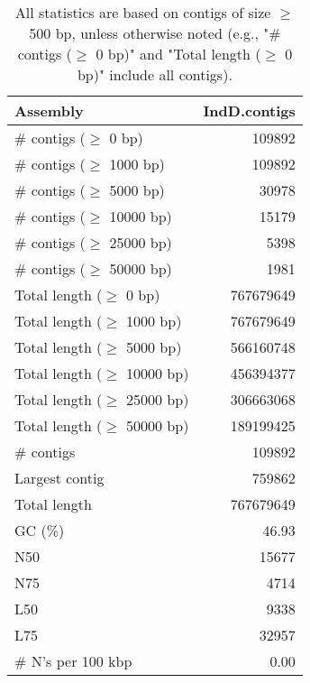 \documentclass[12pt,a4paper]{article}
\begin{document}
\begin{table}[ht]
\begin{center}
\caption{All statistics are based on contigs of size $\geq$ 500 bp, unless otherwise noted (e.g., "\# contigs ($\geq$ 0 bp)" and "Total length ($\geq$ 0 bp)" include all contigs).}
\begin{tabular}{|l*{1}{|r}|}
\hline
Assembly & IndD.contigs \\ \hline
\# contigs ($\geq$ 0 bp) & 109892 \\ \hline
\# contigs ($\geq$ 1000 bp) & 109892 \\ \hline
\# contigs ($\geq$ 5000 bp) & 30978 \\ \hline
\# contigs ($\geq$ 10000 bp) & 15179 \\ \hline
\# contigs ($\geq$ 25000 bp) & 5398 \\ \hline
\# contigs ($\geq$ 50000 bp) & 1981 \\ \hline
Total length ($\geq$ 0 bp) & 767679649 \\ \hline
Total length ($\geq$ 1000 bp) & 767679649 \\ \hline
Total length ($\geq$ 5000 bp) & 566160748 \\ \hline
Total length ($\geq$ 10000 bp) & 456394377 \\ \hline
Total length ($\geq$ 25000 bp) & 306663068 \\ \hline
Total length ($\geq$ 50000 bp) & 189199425 \\ \hline
\# contigs & 109892 \\ \hline
Largest contig & 759862 \\ \hline
Total length & 767679649 \\ \hline
GC (\%) & 46.93 \\ \hline
N50 & 15677 \\ \hline
N75 & 4714 \\ \hline
L50 & 9338 \\ \hline
L75 & 32957 \\ \hline
\# N's per 100 kbp & 0.00 \\ \hline
\end{tabular}
\end{center}
\end{table}
\end{document}
